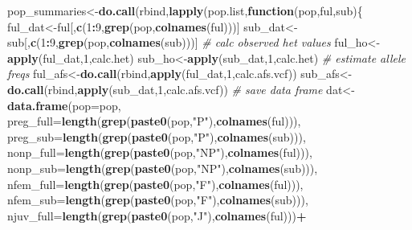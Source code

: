 \documentclass[11pt,]{article}
\newenvironment{Shaded}{\begin{snugshade}}{\end{snugshade}}
\newcommand{\KeywordTok}[1]{\textcolor[rgb]{0.13,0.29,0.53}{\textbf{#1}}}
\newcommand{\DataTypeTok}[1]{\textcolor[rgb]{0.13,0.29,0.53}{#1}}
\newcommand{\DecValTok}[1]{\textcolor[rgb]{0.00,0.00,0.81}{#1}}
\newcommand{\StringTok}[1]{\textcolor[rgb]{0.31,0.60,0.02}{#1}}
\newcommand{\CommentTok}[1]{\textcolor[rgb]{0.56,0.35,0.01}{\textit{#1}}}
\newcommand{\ControlFlowTok}[1]{\textcolor[rgb]{0.13,0.29,0.53}{\textbf{#1}}}
\newcommand{\OperatorTok}[1]{\textcolor[rgb]{0.81,0.36,0.00}{\textbf{#1}}}
\newcommand{\NormalTok}[1]{#1}
\begin{document}
\begin{Shaded}
\begin{Highlighting}[]
\NormalTok{pop_summaries<-}\KeywordTok{do.call}\NormalTok{(rbind,}\KeywordTok{lapply}\NormalTok{(pop.list,}\ControlFlowTok{function}\NormalTok{(pop,ful,sub)\{}
\NormalTok{  ful_dat<-ful[,}\KeywordTok{c}\NormalTok{(}\DecValTok{1}\OperatorTok{:}\DecValTok{9}\NormalTok{,}\KeywordTok{grep}\NormalTok{(pop,}\KeywordTok{colnames}\NormalTok{(ful)))]}
\NormalTok{  sub_dat<-sub[,}\KeywordTok{c}\NormalTok{(}\DecValTok{1}\OperatorTok{:}\DecValTok{9}\NormalTok{,}\KeywordTok{grep}\NormalTok{(pop,}\KeywordTok{colnames}\NormalTok{(sub)))]}
  \CommentTok{# calc observed het values}
\NormalTok{  ful_ho<-}\KeywordTok{apply}\NormalTok{(ful_dat,}\DecValTok{1}\NormalTok{,calc.het)}
\NormalTok{  sub_ho<-}\KeywordTok{apply}\NormalTok{(sub_dat,}\DecValTok{1}\NormalTok{,calc.het)}
  \CommentTok{# estimate allele freqs}
\NormalTok{  ful_afs<-}\KeywordTok{do.call}\NormalTok{(rbind,}\KeywordTok{apply}\NormalTok{(ful_dat,}\DecValTok{1}\NormalTok{,calc.afs.vcf))}
\NormalTok{  sub_afs<-}\KeywordTok{do.call}\NormalTok{(rbind,}\KeywordTok{apply}\NormalTok{(sub_dat,}\DecValTok{1}\NormalTok{,calc.afs.vcf))}
  \CommentTok{# save data frame}
\NormalTok{  dat<-}\KeywordTok{data.frame}\NormalTok{(}\DataTypeTok{pop=}\NormalTok{pop,}
                  \DataTypeTok{preg_full=}\KeywordTok{length}\NormalTok{(}\KeywordTok{grep}\NormalTok{(}\KeywordTok{paste0}\NormalTok{(pop,}\StringTok{"P"}\NormalTok{),}\KeywordTok{colnames}\NormalTok{(ful))),}
                  \DataTypeTok{preg_sub=}\KeywordTok{length}\NormalTok{(}\KeywordTok{grep}\NormalTok{(}\KeywordTok{paste0}\NormalTok{(pop,}\StringTok{"P"}\NormalTok{),}\KeywordTok{colnames}\NormalTok{(sub))),}
                  \DataTypeTok{nonp_full=}\KeywordTok{length}\NormalTok{(}\KeywordTok{grep}\NormalTok{(}\KeywordTok{paste0}\NormalTok{(pop,}\StringTok{"NP"}\NormalTok{),}\KeywordTok{colnames}\NormalTok{(ful))),}
                  \DataTypeTok{nonp_sub=}\KeywordTok{length}\NormalTok{(}\KeywordTok{grep}\NormalTok{(}\KeywordTok{paste0}\NormalTok{(pop,}\StringTok{"NP"}\NormalTok{),}\KeywordTok{colnames}\NormalTok{(sub))),}
                  \DataTypeTok{nfem_full=}\KeywordTok{length}\NormalTok{(}\KeywordTok{grep}\NormalTok{(}\KeywordTok{paste0}\NormalTok{(pop,}\StringTok{"F"}\NormalTok{),}\KeywordTok{colnames}\NormalTok{(ful))),}
                  \DataTypeTok{nfem_sub=}\KeywordTok{length}\NormalTok{(}\KeywordTok{grep}\NormalTok{(}\KeywordTok{paste0}\NormalTok{(pop,}\StringTok{"F"}\NormalTok{),}\KeywordTok{colnames}\NormalTok{(sub))),}
                  \DataTypeTok{njuv_full=}\KeywordTok{length}\NormalTok{(}\KeywordTok{grep}\NormalTok{(}\KeywordTok{paste0}\NormalTok{(pop,}\StringTok{"J"}\NormalTok{),}\KeywordTok{colnames}\NormalTok{(ful)))}\OperatorTok{+}

\end{Highlighting}
\end{Shaded}
\end{document}
